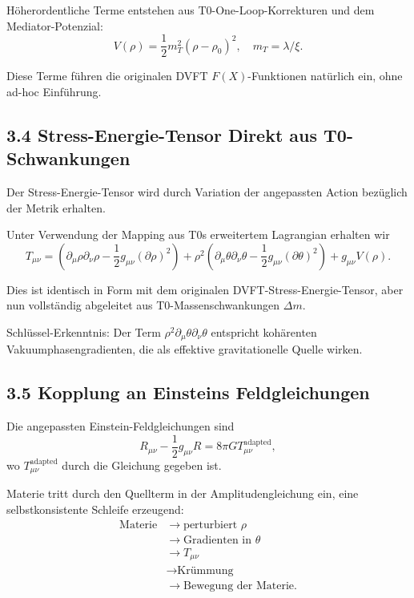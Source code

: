 	Höherordentliche Terme entstehen aus T0-One-Loop-Korrekturen und dem Mediator-Potenzial:
	\[
	V(\rho) = \frac{1}{2} m_T^2 (\rho - \rho_0)^2, \quad m_T = \lambda / \xi.
	\]
	
	Diese Terme führen die originalen DVFT $F(X)$-Funktionen natürlich ein, ohne ad-hoc Einführung.
	
	\subsection{3.4 Stress-Energie-Tensor Direkt aus T0-Schwankungen}
	
	Der Stress-Energie-Tensor wird durch Variation der angepassten Action bezüglich der Metrik erhalten.
	
	Unter Verwendung der Mapping aus T0s erweitertem Lagrangian erhalten wir
	\[
	T_{\mu\nu} = (\partial_\mu \rho \partial_\nu \rho - \frac{1}{2} g_{\mu\nu} (\partial \rho)^2) + \rho^2 (\partial_\mu \theta \partial_\nu \theta - \frac{1}{2} g_{\mu\nu} (\partial \theta)^2) + g_{\mu\nu} V(\rho).
	\]
	
	Dies ist identisch in Form mit dem originalen DVFT-Stress-Energie-Tensor, aber nun vollständig abgeleitet aus T0-Massenschwankungen $\Delta m$.
	
	Schlüssel-Erkenntnis: Der Term $\rho^2 \partial_\mu \theta \partial_\nu \theta$ entspricht kohärenten Vakuumphasengradienten, die als effektive gravitationelle Quelle wirken.
	
	\subsection{3.5 Kopplung an Einsteins Feldgleichungen}
	
	Die angepassten Einstein-Feldgleichungen sind
	\[
	R_{\mu\nu} - \frac{1}{2} g_{\mu\nu} R = 8\pi G T_{\mu\nu}^{\text{adapted}},
	\]
	wo $T_{\mu\nu}^{\text{adapted}}$ durch die Gleichung gegeben ist.
	
	Materie tritt durch den Quellterm in der Amplitudengleichung ein, eine selbstkonsistente Schleife erzeugend:
\[
\begin{aligned}
	\text{Materie} &\to \text{perturbiert } \rho \\
	&\to \text{Gradienten in } \theta \\
	&\to T_{\mu\nu} \\
	&\to \text{Krümmung} \\
	&\to \text{Bewegung der Materie}.
\end{aligned}
\]

